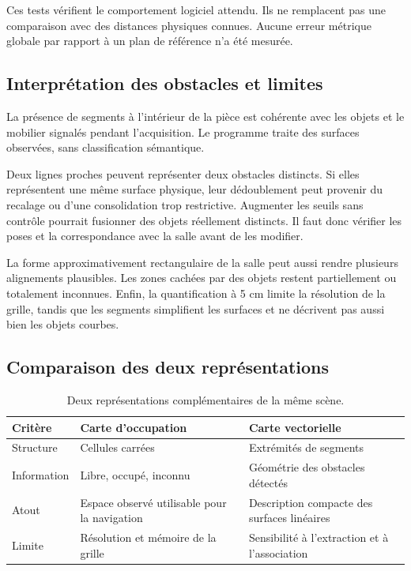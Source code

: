 \documentclass[11pt,a4paper]{article}
\begin{document}
Ces tests vérifient le comportement logiciel attendu. Ils ne remplacent
pas une comparaison avec des distances physiques connues. Aucune erreur
métrique globale par rapport à un plan de référence n'a été mesurée.

\subsection{Interprétation des obstacles et limites}
La présence de segments à l'intérieur de la pièce est cohérente avec les
objets et le mobilier signalés pendant l'acquisition. Le programme traite
des surfaces observées, sans classification sémantique.

Deux lignes proches peuvent représenter deux obstacles distincts. Si elles
représentent une même surface physique, leur dédoublement peut provenir
du recalage ou d'une consolidation trop restrictive. Augmenter les seuils
sans contrôle pourrait fusionner des objets réellement distincts. Il faut
donc vérifier les poses et la correspondance avec la salle avant de les modifier.

La forme approximativement rectangulaire de la salle peut aussi rendre
plusieurs alignements plausibles. Les zones cachées par des objets restent
partiellement ou totalement inconnues. Enfin, la quantification à 5 cm
limite la résolution de la grille, tandis que les segments simplifient les
surfaces et ne décrivent pas aussi bien les objets courbes.

\subsection{Comparaison des deux représentations}
\begin{table}[h]
\centering
\caption{Deux représentations complémentaires de la même scène.}
\begin{tabularx}{\linewidth}{lXX}
\toprule
Critère & Carte d'occupation & Carte vectorielle \\
\midrule
Structure & Cellules carrées & Extrémités de segments \\
Information & Libre, occupé, inconnu & Géométrie des obstacles détectés \\
Atout & Espace observé utilisable pour la navigation & Description compacte des surfaces linéaires \\
Limite & Résolution et mémoire de la grille & Sensibilité à l'extraction et à l'association \\
\bottomrule
\end{tabularx}
\end{table}
\end{document}
